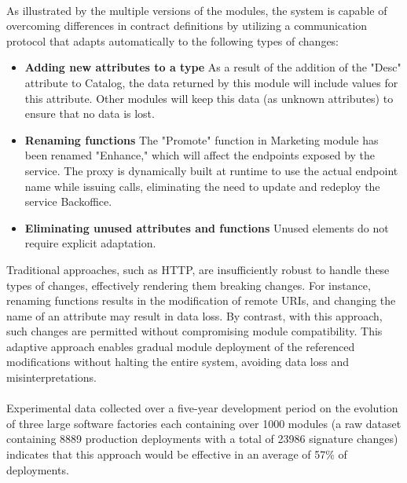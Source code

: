 \paragraph{}

As illustrated by the multiple versions of the modules,
the system is capable of overcoming differences in contract definitions by utilizing a communication protocol
that adapts automatically to the following types of changes:

\begin{itemize}
    \item \textbf{Adding new attributes to a type} As a result of the addition of the "Desc" attribute to Catalog, the data returned by this module will include values for this attribute.
    Other modules will keep this data (as unknown attributes) to ensure that no data is lost.
    \item \textbf{Renaming functions} The "Promote" function in Marketing module has been renamed "Enhance," which will affect the endpoints exposed by the service.
    The proxy is dynamically built at runtime to use the actual endpoint name while issuing calls, eliminating the need to update and redeploy the service Backoffice.
    \item \textbf{Eliminating unused attributes and functions} Unused elements do not require explicit adaptation.
\end{itemize}

Traditional approaches, such as HTTP, are insufficiently robust to handle these types of changes, effectively rendering them breaking changes.
For instance, renaming functions results in the modification of remote URIs, and changing the name of an attribute may result in data loss.
By contrast, with this approach, such changes are permitted without compromising module compatibility.
This adaptive approach enables gradual module deployment of the referenced modifications without halting the entire system, avoiding data loss and misinterpretations.

\paragraph{}

Experimental data \cite{seco2020robust} collected over a five-year development period on the evolution of three large software factories each containing over 1000 modules
(a raw dataset containing 8889 production deployments with a total of 23986 signature changes)
indicates that this approach would be effective in an average of 57\% of deployments.

